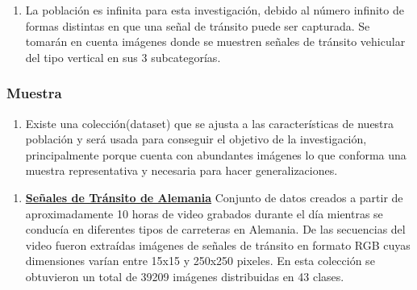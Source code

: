 		\begin{enumerate}		
			\item[]  La población es infinita para esta investigación, debido al número infinito de formas distintas en que una señal de tránsito puede ser capturada. Se tomarán en cuenta imágenes donde se muestren señales de tránsito vehicular del tipo vertical en sus 3 subcategorías.
		\end{enumerate}

		\subsubsection{Muestra} 
		\begin{enumerate}		
			\item[]	Existe una colección(dataset) que se ajusta a las características de nuestra población y será usada para conseguir el objetivo de la investigación, principalmente porque cuenta con abundantes imágenes lo que conforma una muestra representativa y necesaria para hacer generalizaciones. 
		\end{enumerate}

		\begin{enumerate}
			\item[]  {\bf \underline {Señales de Tránsito de Alemania}}\newline
			Conjunto de datos creados a partir de aproximadamente 10 horas de video grabados durante el día mientras se conducía en diferentes tipos de carreteras en Alemania. De las secuencias del video fueron extraídas imágenes de señales de tránsito en formato RGB cuyas dimensiones varían entre 15x15 y 250x250 pixeles. En esta colección se obtuvieron un total de 39209 imágenes distribuidas en 43 clases.  \citep{Stallkamp-IJCNN-2011} 
		\end{enumerate}

		
